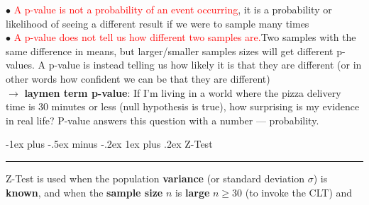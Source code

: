\documentclass[letterpaper, 10.5pt,landscape]{article}
\makeatletter
\renewcommand{\subsubsection}{\@startsection{subsubsection}{3}{0mm}%
                                {-1ex plus -.5ex minus -.2ex}%
                                {1ex plus .2ex}%
                                {\normalfont\small\bfseries}}
\makeatother
\begin{document}
\begin{multicols*}{3}
$\bullet$ \textcolor{red}{A p-value is not a probability of an event occurring}, it is a
probability or likelihood of seeing a different result if we were to sample
many times \\

$\bullet$ \textcolor{red}{A p-value does not tell us how different two samples are.}Two
samples with the same difference in means, but larger/smaller samples
sizes will get different p-values. A p-value is instead telling us how likely
it is that they are different (or in other words how confident we can be
that they are different) \\

$\rightarrow$ \textbf{laymen term p-value}: If I’m living in a world where the pizza delivery time is 30 minutes or less (null hypothesis is true), how surprising is my evidence in real life? P-value answers this question with a number — probability.

















\vspace{3pt}
\subsubsection{Z-Test} {\color{teal}\hrule height 0.5pt} \smallskip
Z-Test is used when the population \textbf{variance} (or standard deviation $\sigma$) is \textbf{known}, and when the \textbf{sample size} $n$ is \textbf{large} $n \geq 30$ (to invoke the CLT) and \\

\vspace{3pt}


\end{multicols*}
\end{document}
